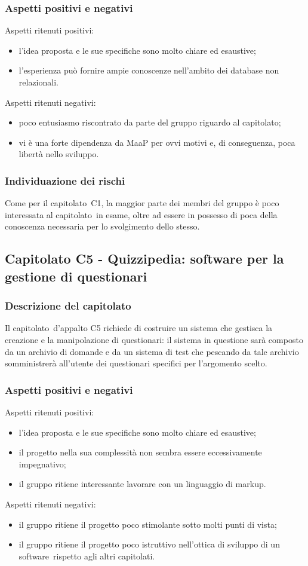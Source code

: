\documentclass[../StudioDiFattibilita.tex]{subfiles}
\begin{document}
		\subsubsection{Aspetti positivi e negativi}
		Aspetti ritenuti positivi:
			\begin{itemize}
				\item l'idea proposta e le sue specifiche sono molto chiare ed esaustive;
				\item l'esperienza può fornire ampie conoscenze nell'ambito dei database non relazionali.
			\end{itemize}
		Aspetti ritenuti negativi:
			\begin{itemize}
				\item poco entusiasmo riscontrato da parte del gruppo riguardo al capitolato\g;
				\item vi è una forte dipendenza da MaaP per ovvi motivi e, di conseguenza, poca libertà nello sviluppo.
			\end{itemize}
		\subsubsection{Individuazione dei rischi}
		Come per il capitolato\g\ C1, la maggior parte dei membri del gruppo è poco interessata al capitolato\g\ 
in esame, oltre ad essere in possesso di poca della conoscenza necessaria per lo svolgimento dello stesso.
	\subsection{Capitolato C5 - Quizzipedia: software per la gestione di questionari}
		\subsubsection{Descrizione del capitolato}
		Il capitolato\g\ d'appalto C5 richiede di costruire un sistema che gestisca la creazione e la manipolazione di questionari: il sistema in questione sarà composto da un archivio di domande e da un sistema di test che pescando da tale archivio somministrerà all'utente dei questionari specifici per l'argomento scelto.
		\subsubsection{Aspetti positivi e negativi}
		Aspetti ritenuti positivi:
			\begin{itemize}
				\item l'idea proposta e le sue specifiche sono molto chiare ed esaustive;
				\item il progetto nella sua complessità non sembra essere eccessivamente impegnativo;
				\item il gruppo ritiene interessante lavorare con un linguaggio di markup\g.
			\end{itemize}
		Aspetti ritenuti negativi:
			\begin{itemize}
				\item il gruppo ritiene il progetto poco stimolante sotto molti punti di vista;
				\item il gruppo ritiene il progetto poco istruttivo nell'ottica di sviluppo di un software\g\ rispetto agli altri capitolati.
			\end{itemize}
\end{document}
